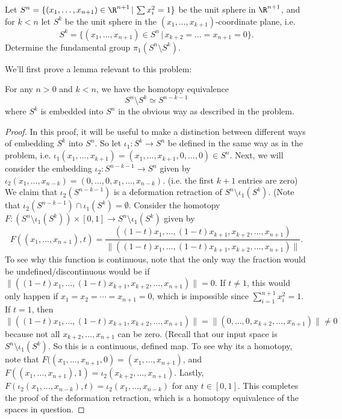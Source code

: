 \documentclass[11pt,letterpaper]{article}
\begin{document}
\begin{problem}
    Let $S^n=\{(x_1,\dots,x_{n+1})\in \R^{n+1}\,|\,\sum x_i^2=1\}$ be the unit sphere in $\R^{n+1}$, and for $k<n$ let $S^k$ be the unit sphere in the $(x_1,\dots,x_{k+1})$-coordinate plane, i.e.\ $$S^k=\{(x_1,\dots,x_{n+1})\in S^n\,|\,x_{k+2}=\dots=x_{n+1}=0\}.$$ Determine the fundamental group $\pi_1(S^n\setminus S^k)$. 
\end{problem}

\begin{solution}
    We'll first prove a lemma relevant to this problem:
    \begin{ilemma}
        For any $n>0$ and $k<n$, we have the homotopy equivalence
        \[
            S^n\setminus S^k\simeq S^{n-k-1}
        \] 
        where $S^k$ is embedded into $S^n$ in the obvious way as described in the problem.
    \end{ilemma}
    \begin{proof}
        In this proof, it will be useful to make a distinction between different ways of embedding $S^k$ into $S^n$. So let $\iota_1 : S^k \to S^n$ be defined in the same way as in the problem, i.e. $\iota_1(x_1,\ldots,x_{k+1}) = (x_1,\ldots,x_{k+1}, 0, \ldots, 0)\in S^n$. Next, we will consider the embedding $\iota_2 : S^{n-k-1} \to S^n$ given by $\iota_2(x_1,\ldots,x_{n-k}) = (0, \ldots, 0, x_1,\ldots,x_{n-k})$. (i.e. the first $k+1$ entries are zero) We claim that $\iota_2(S^{n-k-1})$ is a deformation retraction of $S^n\setminus\iota_1(S^k)$. (Note that $\iota_2(S^{n-k-1})\cap \iota_1(S^k)=\emptyset$. Consider the homotopy $F : (S^n\setminus \iota_1(S^k))\times [0,1] \to S^n\setminus \iota_1(S^k)$ given by 
        \[
            F((x_1,\ldots,x_{n+1}), t) = \frac{((1-t)x_1,\ldots,(1-t)x_{k+1}, x_{k+2}, \ldots, x_{n+1})}{\|((1-t)x_1,\ldots,(1-t)x_{k+1}, x_{k+2}, \ldots, x_{n+1})\|}.
        \] 
        To see why this function is continuous, note that the only way the fraction would be undefined/discontinuous would be if $\|((1-t)x_1,\ldots,(1-t)x_{k+1},x_{k+2},\ldots,x_{n+1})\|=0$. If $t\neq 1$, this would only happen if $x_1=x_2=\cdots=x_{n+1}=0$, which is impossible since $\sum^{n+1}_{i=1} x_i^2=1$. If $t=1$, then
        \[
            \|((1-t)x_1,\ldots,(1-t)x_{k+1},x_{k+2},\ldots,x_{n+1})\|=\|(0,\ldots,0,x_{k+2},\ldots,x_{n+1})\|\neq 0
        \] 
        because not all $x_{k+2}, \ldots, x_{n+1}$ can be zero. (Recall that our input space is $S^n\setminus \iota_1(S^k)$. So this is a continuous, defined map. To see why its a homotopy, note that $F((x_1,\ldots,x_{n+1}, 0) = (x_1,\ldots,x_{n+1})$, and $F((x_1,\ldots,x_{n+1}), 1) = \iota_2(x_{k+2},\ldots,x_{n+1})$. Lastly, $F(\iota_2(x_{1},\ldots,x_{n-k}), t) = \iota_2(x_{1}, \ldots, x_{n-k})$ for any $t\in [0,1]$. This completes the proof of the deformation retraction, which is a homotopy equivalence of the spaces in question.

\end{proof}
\end{solution}
\end{document}

